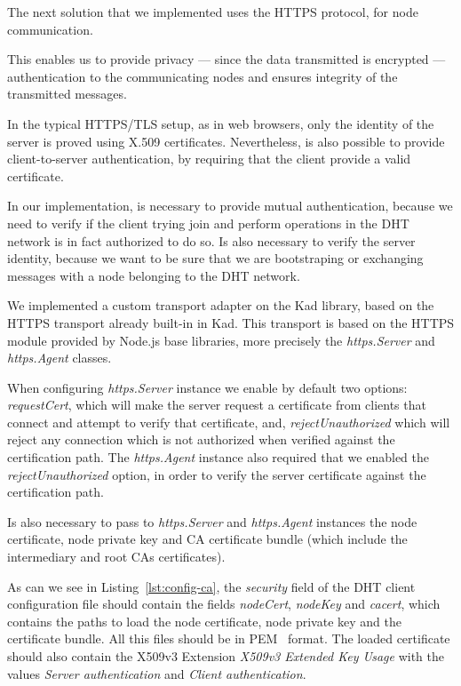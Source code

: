 The next solution that we implemented uses the HTTPS protocol, for node communication.

This enables us to provide privacy — since the data transmitted is encrypted — authentication to the communicating nodes and ensures integrity of the transmitted messages.

In the typical HTTPS/TLS setup, as in web browsers, only the identity of the server is proved using X.509 certificates.
Nevertheless, is also possible to provide client-to-server authentication, by requiring that the client provide a valid certificate.

In our implementation, is necessary to provide mutual authentication, because we need to verify if the client trying join and perform operations in the DHT network is in fact authorized to do so.
Is also necessary to verify the server identity, because we want to be sure that we are bootstraping or exchanging messages with a node belonging to the DHT network.

We implemented a custom transport adapter on the Kad library, based on the HTTPS transport already built-in in Kad.
This transport is based on the HTTPS module provided by Node.js base libraries, more precisely the \textit{https.Server} and \textit{https.Agent} classes.

When configuring \textit{https.Server} instance we enable by default two options: \textit{requestCert}, which will make the server request a certificate from clients that connect and attempt to verify that certificate, and, \textit{rejectUnauthorized} which will reject any connection which is not authorized when verified against the certification path.
The \textit{https.Agent} instance also required that we enabled the \textit{rejectUnauthorized} option, in order to verify the server certificate against the certification path.

Is also necessary to pass to \textit{https.Server} and \textit{https.Agent} instances the node certificate, node private key and CA certificate bundle (which include the intermediary and root CAs certificates).

As can we see in Listing~\ref{lst:config-ca}, the \textit{security} field of the DHT client configuration file should contain the fields \textit{nodeCert}, \textit{nodeKey} and \textit{cacert}, which contains the paths to load the node certificate, node private key and the certificate bundle.
All this files should be in \ac{PEM}~\cite{rfc1421} format.
The loaded certificate should also contain the X509v3 Extension \textit{X509v3 Extended Key Usage} with the values \textit{Server authentication} and \textit{Client authentication}.

